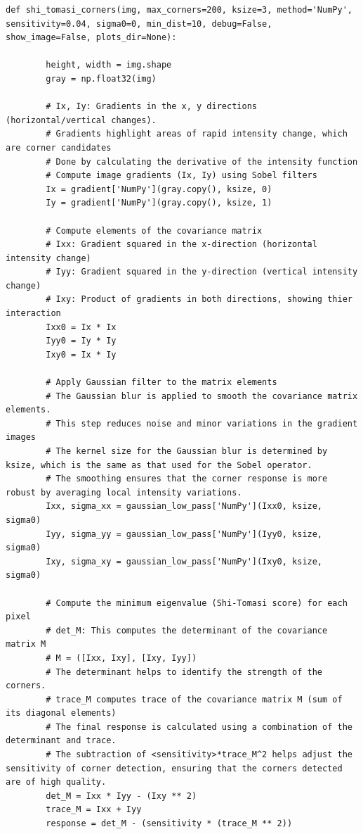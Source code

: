 \documentclass[11pt, conference, letterpaper]{IEEEtran}
\begin{document}
\onecolumn
\begin{lstlisting}[style=python, caption={Shi-Tomasi Corners Function}, label={lst:shi-tomasi}]
    def shi_tomasi_corners(img, max_corners=200, ksize=3, method='NumPy', sensitivity=0.04, sigma0=0, min_dist=10, debug=False, show_image=False, plots_dir=None):
    
        height, width = img.shape
        gray = np.float32(img)
            
        # Ix, Iy: Gradients in the x, y directions (horizontal/vertical changes).
        # Gradients highlight areas of rapid intensity change, which are corner candidates
        # Done by calculating the derivative of the intensity function
        # Compute image gradients (Ix, Iy) using Sobel filters
        Ix = gradient['NumPy'](gray.copy(), ksize, 0)
        Iy = gradient['NumPy'](gray.copy(), ksize, 1)
            
        # Compute elements of the covariance matrix
        # Ixx: Gradient squared in the x-direction (horizontal intensity change)
        # Iyy: Gradient squared in the y-direction (vertical intensity change)
        # Ixy: Product of gradients in both directions, showing thier interaction
        Ixx0 = Ix * Ix
        Iyy0 = Iy * Iy
        Ixy0 = Ix * Iy

        # Apply Gaussian filter to the matrix elements
        # The Gaussian blur is applied to smooth the covariance matrix elements. 
        # This step reduces noise and minor variations in the gradient images 
        # The kernel size for the Gaussian blur is determined by ksize, which is the same as that used for the Sobel operator. 
        # The smoothing ensures that the corner response is more robust by averaging local intensity variations.
        Ixx, sigma_xx = gaussian_low_pass['NumPy'](Ixx0, ksize, sigma0)
        Iyy, sigma_yy = gaussian_low_pass['NumPy'](Iyy0, ksize, sigma0)
        Ixy, sigma_xy = gaussian_low_pass['NumPy'](Ixy0, ksize, sigma0)
  
        # Compute the minimum eigenvalue (Shi-Tomasi score) for each pixel
        # det_M: This computes the determinant of the covariance matrix M
        # M = ([Ixx, Ixy], [Ixy, Iyy])
        # The determinant helps to identify the strength of the corners.
        # trace_M computes trace of the covariance matrix M (sum of its diagonal elements)
        # The final response is calculated using a combination of the determinant and trace.
        # The subtraction of <sensitivity>*trace_M^2 helps adjust the sensitivity of corner detection, ensuring that the corners detected are of high quality.
        det_M = Ixx * Iyy - (Ixy ** 2)
        trace_M = Ixx + Iyy
        response = det_M - (sensitivity * (trace_M ** 2))


\end{lstlisting}
\end{document}

